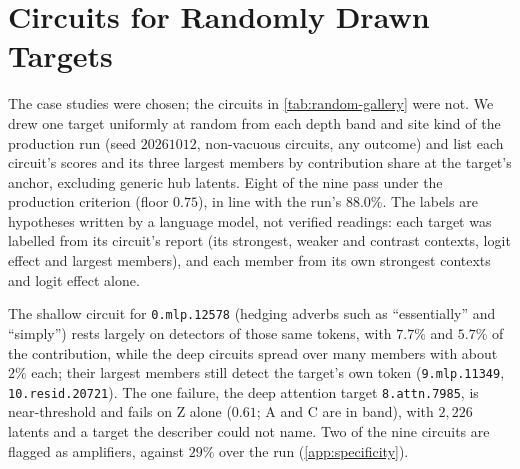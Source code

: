 \documentclass[10pt]{article}
\begin{document}
\FloatBarrier   %
\section{Circuits for Randomly Drawn Targets}
\label{app:random-gallery}
The case studies were chosen; the circuits in \cref{tab:random-gallery} were not.
We drew one target uniformly at random from each depth band and site kind of the production run (seed $20261012$, non-vacuous circuits, any outcome) and list each circuit's scores and its three largest members by contribution share at the target's anchor, excluding generic hub latents.
Eight of the nine pass under the production criterion (floor $0.75$), in line with the run's $88.0\%$.
The labels are hypotheses written by a language model, not verified readings: each target was labelled from its circuit's report (its strongest, weaker and contrast contexts, logit effect and largest members), and each member from its own strongest contexts and logit effect alone.

The shallow circuit for \texttt{0.mlp.12578} (hedging adverbs such as ``essentially'' and ``simply'') rests largely on detectors of those same tokens, with $7.7\%$ and $5.7\%$ of the contribution, while the deep circuits spread over many members with about $2\%$ each; their largest members still detect the target's own token (\texttt{9.mlp.11349}, \texttt{10.resid.20721}).
The one failure, the deep attention target \texttt{8.attn.7985}, is near-threshold and fails on Z alone ($0.61$; A and C are in band), with $2{,}226$ latents and a target the describer could not name.
Two of the nine circuits are flagged as amplifiers, against $29\%$ over the run (\cref{app:specificity}).
\end{document}
